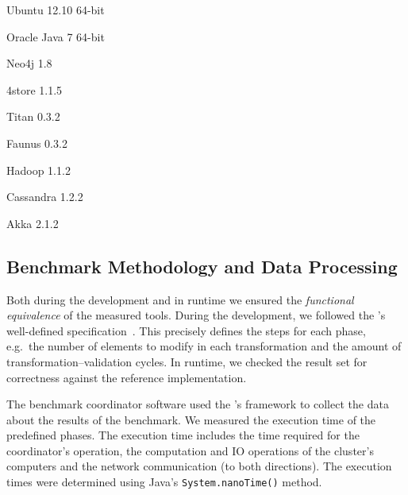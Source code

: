 \begin{itemize*}
    \item Ubuntu 12.10 64-bit
    \item Oracle Java 7 64-bit
    \item Neo4j 1.8
    \item 4store 1.1.5
    \item Titan 0.3.2
      \item Faunus 0.3.2
      \item Hadoop 1.1.2
      \item Cassandra 1.2.2
    \item Akka 2.1.2
\end{itemize*}

\subsection{Benchmark Methodology and Data Processing}
\label{benchmark-methodology}

Both during the development and in runtime we ensured the \emph{functional equivalence} of the measured tools. During the development, we followed the \tb{}'s well-defined specification~\cite{ASE2013}. This precisely defines the steps for each phase, e.g.\ the number of elements to modify in each transformation and the amount of transformation--validation cycles. In runtime, we checked the result set for correctness against the reference implementation. 

The benchmark coordinator software used the \tb{}'s framework to collect the data about the results of the benchmark. We measured the execution time of the predefined phases. The execution time includes the time required for the coordinator's operation, the computation and IO operations of the cluster's computers and the network communication (to both directions). The execution times were determined using Java's \texttt{System.nanoTime()} method.

